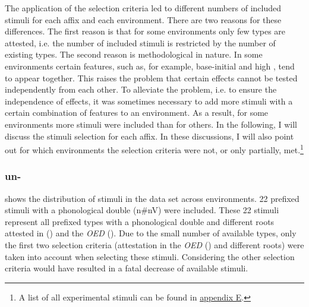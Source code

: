  

The application of the selection criteria led to different numbers of included stimuli for each affix and each environment. 
There are two reasons for these differences. The first reason is that for some environments only few types are attested, i.e. the number of included stimuli is restricted by the number of existing types. The second reason is methodological in nature. 
In some environments 
certain features, such as, for example, base-initial  and high , tend to appear together. This raises the problem that certain effects cannot be tested independently from each other. To alleviate the problem, i.e. to ensure the independence of effects, it was sometimes necessary to add more stimuli with a certain combination of features to an environment. As a result, for some environments more stimuli were included than for others. 
In the following, I will discuss the stimuli selection for each affix. In these discussions, I will also point out for which environments the selection criteria were not, or only partially, met.\footnote{A list of all experimental stimuli can be found in \hyperref[Appendix E: Stimuli of Experimental Study]{appendix E}.} 


\subsubsection{un-}

 shows the distribution of  stimuli in the data set across environments. 
22  prefixed stimuli with a phonological double ({n\#nV}) were included. These 22 stimuli represent all prefixed types with a phonological double and different roots attested in  (\citealt{Davies.20082014}) and the \textit{OED} (\citealt{OED.2013}). 
Due to the small number of available types, only the first two selection criteria (attestation in the \textit{OED} (\citealt{OED.2013}) and different roots) were taken into account when selecting these stimuli. Considering the other selection criteria would have resulted in a fatal decrease of available stimuli. 



